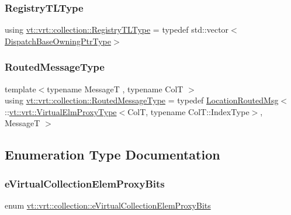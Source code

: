 \subsubsection{\texorpdfstring{Registry\+T\+L\+Type}{RegistryTLType}}
{\footnotesize\ttfamily using \hyperlink{namespacevt_1_1vrt_1_1collection_aecdad7ed4df3be1bab2a6bb9c5945964}{vt\+::vrt\+::collection\+::\+Registry\+T\+L\+Type} = typedef std\+::vector$<$\hyperlink{namespacevt_1_1vrt_1_1collection_a124f83d203352b6bccc4f12ca489b68b}{Dispatch\+Base\+Owning\+Ptr\+Type}$>$}

\mbox{\label{namespacevt_1_1vrt_1_1collection_a1bbc628be0955797f2d45227ee526346}} 
\subsubsection{\texorpdfstring{Routed\+Message\+Type}{RoutedMessageType}}
{\footnotesize\ttfamily template$<$typename MessageT , typename ColT $>$ \\
using \hyperlink{namespacevt_1_1vrt_1_1collection_a1bbc628be0955797f2d45227ee526346}{vt\+::vrt\+::collection\+::\+Routed\+Message\+Type} = typedef \hyperlink{namespacevt_a0cb65f2151629893480ef391def4e733}{Location\+Routed\+Msg}$<$ \+::\hyperlink{namespacevt_1_1vrt_a620a5c8c59d13e513f690c74b4af516f}{vt\+::vrt\+::\+Virtual\+Elm\+Proxy\+Type}$<$ColT, typename Col\+T\+::\+Index\+Type$>$, MessageT $>$}



\subsection{Enumeration Type Documentation}
\mbox{\label{namespacevt_1_1vrt_1_1collection_a216d0b183a155808303b12c258f259a0}} 
\subsubsection{\texorpdfstring{e\+Virtual\+Collection\+Elem\+Proxy\+Bits}{eVirtualCollectionElemProxyBits}}
{\footnotesize\ttfamily enum \hyperlink{namespacevt_1_1vrt_1_1collection_a216d0b183a155808303b12c258f259a0}{vt\+::vrt\+::collection\+::e\+Virtual\+Collection\+Elem\+Proxy\+Bits}}

